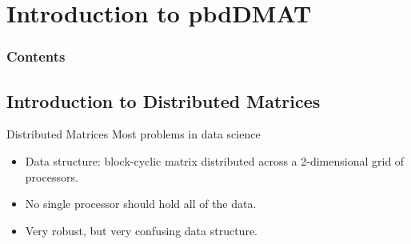 \section[pbdDMAT]{Introduction to pbdDMAT}

\hidenum
\begin{frame}[noframenumbering]
\frametitle{Contents}
 \tableofcontents[currentsection,hideothersubsections,sectionstyle=show/hide]
\end{frame}
\shownum

\subsection{Introduction to Distributed Matrices}

\begin{frame}
  \begin{block}{Distributed Matrices}\pause
  Most problems in data science 
    \begin{itemize}
     \item Data structure:  block-cyclic matrix distributed across a 2-dimensional grid of processors.
     \item No single processor should hold all of the data.
     \item Very robust, but very confusing data structure.
    \end{itemize}
  \end{block}
\end{frame}



